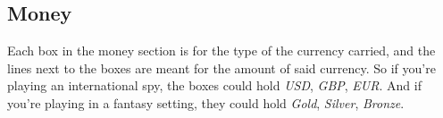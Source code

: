 \subsection{Money}
Each box in the money section is for the type of the currency carried, and the lines next to the boxes are meant for the amount of said currency.
So if you're playing an international spy, the boxes could hold \textit{USD}, \textit{GBP}, \textit{EUR}.
And if you're playing in a fantasy setting, they could hold \textit{Gold}, \textit{Silver}, \textit{Bronze}.